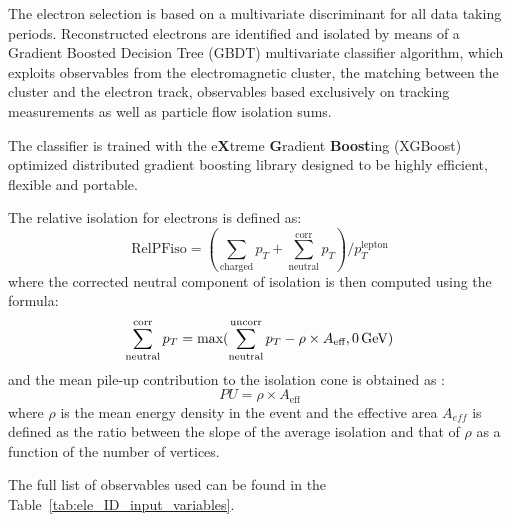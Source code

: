 The electron selection is based on a multivariate discriminant for all data taking periods.
Reconstructed electrons are identified and isolated by means of a Gradient Boosted Decision Tree (GBDT) multivariate classifier algorithm, which exploits observables from the electromagnetic cluster, the matching between the cluster and the electron track, observables based exclusively on tracking measurements as well as particle flow isolation sums.

The classifier is trained with the e\textbf{X}treme \textbf{G}radient \textbf{Boost}ing (XGBoost) optimized distributed gradient boosting library designed to be highly efficient, flexible and portable.

The relative isolation for electrons is defined as: 
\begin{equation}
\text{RelPFiso} = (\sum_{\text{charged}} p_T + \sum^{\text{corr}}_{\text{neutral}} p_T)/p_T^{\text{lepton}}
\label{eqn:elepfrelisoeqn}
\end{equation} 
where the corrected neutral component of isolation is then computed using the formula:
\begin{equation}
\label{eqn:neutralea}
  \sum^{\text{corr}}_{\text{neutral}} p_T = \text{max}(\sum^{\text{uncorr}}_{\text{neutral}} p_T - \rho \times A_\text{eff},0 \,\text{Ge\hspace{-.08em}V})
\end{equation}
and the mean pile-up contribution to the isolation cone is obtained as :
\begin{equation}
  PU =  \rho \times A_\text{eff}
\label{eqn:purho}
\end{equation}
where $\rho$ is the mean energy density in the event and the effective area $A_{eff}$ is defined as the ratio
between the slope of the average isolation and that of $\rho$ as a function of the number of vertices.

The full list of observables used can be found in the Table~\ref{tab:ele_ID_input_variables}.

